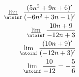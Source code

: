 
\begin{align}
    \lim_{\ntoinf}\frac{(5n^2 + 9n + 6)'}{(-6n^2 + 3n - 1)'} \\
    \lim_{\ntoinf}\frac{10n + 9}{-12n + 3} \\
    \lim_{\ntoinf}\frac{(10n + 9)'}{(-12n + 3)'} \\
    \lim_{\ntoinf}\frac{10}{-12} = -\frac{5}{6} \\
\end{align}

\pagebreak